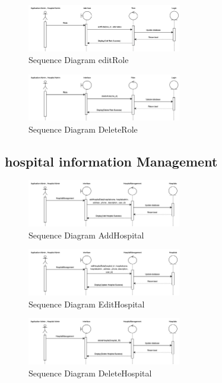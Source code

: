     \begin{figure}[h]
    \centering
    \includegraphics[width=0.6\textwidth]{Sequence 8.4.png}
    \caption{Sequence Diagram editRole}
    \end{figure}

    \begin{figure}[h]
    \centering
    \includegraphics[width=0.6\textwidth]{Sequence 8.5.png}
    \caption{Sequence Diagram DeleteRole}
    \end{figure}

\subsection{hospital information Management}

\begin{figure}[h]
    \centering
    \includegraphics[width=0.6\textwidth]{Sequence 9.1.png}
    \caption{Sequence Diagram AddHospital}
    \end{figure}

    \begin{figure}[h]
    \centering
    \includegraphics[width=0.6\textwidth]{Sequence 9.2.png}
    \caption{Sequence Diagram EditHospital}
    \end{figure}

    \begin{figure}[h]
    \centering
    \includegraphics[width=0.6\textwidth]{Sequence 9.3.png}
    \caption{Sequence Diagram DeleteHospital}
    \end{figure}

